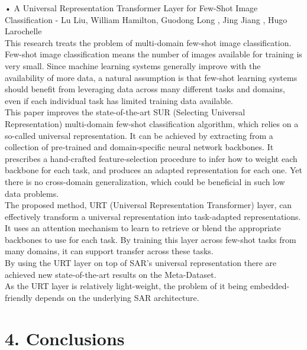 \documentclass[11pt, a4paper, oneside, pdftex]{research_paper}
\begin{document}
\hspace{20mm}•\hspace{3mm}	A Universal Representation Transformer Layer for Few-Shot Image Classification - Lu Liu, William Hamilton, Guodong Long , Jing Jiang , Hugo Larochelle \\
\null \hspace{30mm}	This research treats the problem of multi-domain few-shot image classification. Few-shot image classification means the number of images available for training is very small. Since machine learning systems generally improve with the availability of more data, a natural assumption is that few-shot learning systems should benefit from leveraging data across many different tasks and domains, even if each individual task has limited training data available. \\
\null  \hspace{30mm} This paper improves the state-of-the-art SUR (Selecting Universal Representation) multi-domain few-shot classification algorithm, which relies on a so-called universal representation. It can be achieved by extracting from a collection of pre-trained and domain-specific neural network backbones. It prescribes a hand-crafted feature-selection procedure to infer how to weight each backbone for each task, and produces an adapted representation for each one. Yet there is no cross-domain generalization, which could be beneficial in such low data problems. \\
\null \hspace{30mm}	The proposed method, URT (Universal Representation Transformer) layer, can effectively transform a universal representation into task-adapted representations. It uses an attention mechanism to learn to retrieve or blend the appropriate backbones to use for each task. By training this layer across few-shot tasks from many domains, it can support transfer across these tasks. \\
\null \hspace{30mm}	By using the URT layer on top of SAR’s universal representation there are achieved new state-of-the-art results on the Meta-Dataset. \\
\null \hspace{30mm}	As the URT layer is relatively light-weight, the problem of it being embedded-friendly depends on the underlying SAR architecture.

\section*{4. Conclusions}
\end{document}
